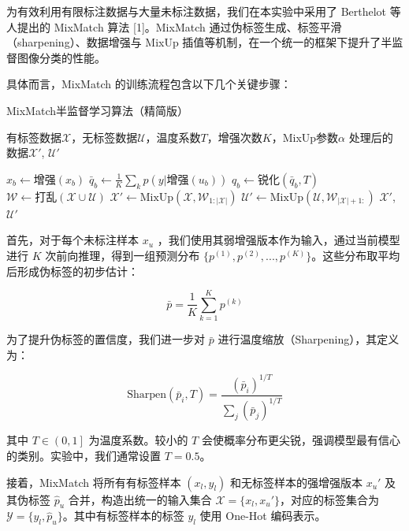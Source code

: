 \documentclass[a4paper, utf8]{ctexart}
\begin{document}
	为有效利用有限标注数据与大量未标注数据，我们在本实验中采用了 Berthelot 等人提出的 MixMatch 算法 [1]。MixMatch 通过伪标签生成、标签平滑（sharpening）、数据增强与 MixUp 插值等机制，在一个统一的框架下提升了半监督图像分类的性能。
	
	具体而言，MixMatch 的训练流程包含以下几个关键步骤：
   
	\begin{algorithm}
	\caption{MixMatch半监督学习算法（精简版）}
		\begin{algorithmic}[1]
			\Require 有标签数据$\mathcal{X}$，无标签数据$\mathcal{U}$，温度系数$T$，增强次数$K$，MixUp参数$\alpha$
			\Ensure 处理后的数据$\mathcal{X}'$, $\mathcal{U}'$
			
			\State $\hat{x}_b \gets \text{增强}(x_b)$
		    \State $\bar{q}_b \gets \frac{1}{K}\sum_k p(y|\text{增强}(u_b))$
		    \State $q_b \gets \text{锐化}(\bar{q}_b, T)$
			\EndFor
			\State $\mathcal{W} \gets \text{打乱}(\mathcal{X} \cup \mathcal{U})$
			\State $\mathcal{X}' \gets \text{MixUp}(\mathcal{X}, \mathcal{W}_{1:|\mathcal{X}|})$
			\State $\mathcal{U}' \gets \text{MixUp}(\mathcal{U}, \mathcal{W}_{|\mathcal{X}|+1:})$
			\State \Return $\mathcal{X}'$, $\mathcal{U}'$
		\end{algorithmic}
	\end{algorithm}
	
	首先，对于每个未标注样本 $x_u$ ，我们使用其弱增强版本作为输入，通过当前模型进行 $K$ 次前向推理，得到一组预测分布 $\{ p^{(1)},p^{(2)},...,p^{(K)} \}$。这些分布取平均后形成伪标签的初步估计：
	
	\vspace{-.5em}
	\begin{equation}
		\bar{p}=\frac{1}{K}\sum^{K}_{k=1} p^{(k)}
	\end{equation}
	
	为了提升伪标签的置信度，我们进一步对 $\bar{p}$ 进行温度缩放（Sharpening），其定义为：
	
	\vspace{-.5em}
	\begin{equation}
		\text{Sharpen}(\bar{p}_i, T)=\frac{(\bar{p}_i)^{1/T}}{\sum_j(\bar{p}_j)^{1/T}}
	\end{equation}
	
	其中 $T\in\left(0,1\right]$ 为温度系数。较小的 $T$ 会使概率分布更尖锐，强调模型最有信心的类别。实验中，我们通常设置 $T=0.5$。
	
	接着，MixMatch 将所有有标签样本 $(x_l, y_l)$ 和无标签样本的强增强版本 $x_u'$ 及其伪标签 $\hat{p}_u$ 合并，构造出统一的输入集合 $\mathcal{X}=\{x_l,x_u'\}$，对应的标签集合为 $\mathcal{Y}=\{y_l,\hat{p}_u\}$。其中有标签样本的标签 $y_l$ 使用 One-Hot 编码表示。
	
\end{document}
